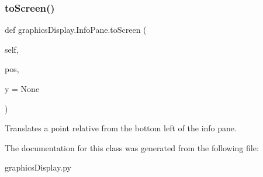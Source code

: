 \subsubsection{\texorpdfstring{to\+Screen()}{toScreen()}}
{\footnotesize\ttfamily def graphics\+Display.\+Info\+Pane.\+to\+Screen (\begin{DoxyParamCaption}\item[{}]{self,  }\item[{}]{pos,  }\item[{}]{y = {\ttfamily None} }\end{DoxyParamCaption})}

\begin{DoxyVerb}  Translates a point relative from the bottom left of the info pane.
\end{DoxyVerb}
 

The documentation for this class was generated from the following file\+:\begin{DoxyCompactItemize}
\item 
graphics\+Display.\+py\end{DoxyCompactItemize}
